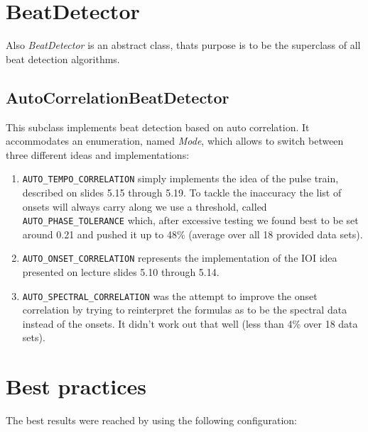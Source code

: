 \section{\ttfamily BeatDetector} \label{sec:beat}
Also \emph{BeatDetector} is an abstract class, thats purpose is to be the
superclass of all beat detection algorithms. 

\subsection{\ttfamily AutoCorrelationBeatDetector} \label{ssec:beatauto}
This subclass implements beat detection based on auto correlation. It
accommodates an enumeration, named \emph{Mode}, which allows to switch between
three different ideas and implementations:

\begin{enumerate}
  \item \texttt{AUTO\_TEMPO\_CORRELATION} simply implements the idea of the
  pulse train, described on slides 5.15 through 5.19. To tackle the inaccuracy the
  list of onsets will always carry along we use a threshold, called
  \texttt{AUTO\_PHASE\_TOLERANCE} which, after excessive testing we found best
  to be set around 0.21 and pushed it up to 48\% (average over all 18 provided data
  sets).
  \item \texttt{AUTO\_ONSET\_CORRELATION} represents the implementation of the
  IOI idea presented on lecture slides 5.10 through 5.14.
  \item \texttt{AUTO\_SPECTRAL\_CORRELATION} was the attempt to improve the
  onset correlation by trying to reinterpret the formulas as to be the spectral data
  instead of the onsets. It didn't work out that well (less than 4\% over 18
  data sets).
\end{enumerate}

\section{Best practices} \label{sec:bestresults}
The best results were reached by using the following configuration:


